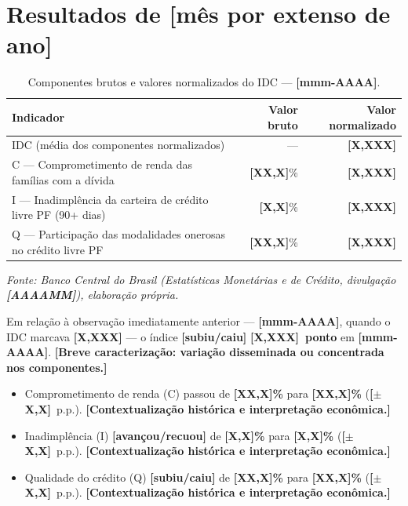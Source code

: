 \documentclass[11pt,a4paper]{article}
\newcommand{\fonte}[1]{%
  \par\vspace{0.2\baselineskip}%
  \small\textit{Fonte: #1}\par\vspace{0.8\baselineskip}%
}
\newcommand{\placeholder}[1]{\textcolor{red!70!black}{\textbf{[#1]}}}
\newcommand{\mesreferencia}{\placeholder{mês por extenso de ano}}   %
\newcommand{\mesref}{\placeholder{mmm-AAAA}}                        %
\newcommand{\mesanterior}{\placeholder{mmm-AAAA}}                   %
\newcommand{\competencia}{\placeholder{AAAAMM}}                     %
\begin{document}
\section{Resultados de \mesreferencia}

\begin{table}[htbp]
  \centering
  \caption{Componentes brutos e valores normalizados do IDC --- \mesref.}
  \label{tab:componentes}
  \begin{tabular}{p{8.0cm}rr}
    \toprule
    Indicador & Valor bruto & Valor normalizado \\
    \midrule
    IDC (média dos componentes normalizados)
      & ---
      & \textbf{\placeholder{X,XXX}} \\
    C --- Comprometimento de renda das famílias com a dívida
      & \placeholder{XX,X}\%
      & \placeholder{X,XXX} \\
    I --- Inadimplência da carteira de crédito livre PF (90+ dias)
      & \placeholder{X,X}\%
      & \placeholder{X,XXX} \\
    Q --- Participação das modalidades onerosas no crédito livre PF
      & \placeholder{XX,X}\%
      & \placeholder{X,XXX} \\
    \bottomrule
  \end{tabular}
\end{table}

\fonte{Banco Central do Brasil (Estatísticas Monetárias e de Crédito,
divulgação \competencia), elaboração própria.}

Em relação à observação imediatamente anterior --- \textbf{\mesanterior}, quando o IDC
marcava \textbf{\placeholder{X,XXX}} --- o índice \placeholder{subiu\slash{}caiu}
\textbf{\placeholder{X,XXX}~ponto} em \mesref.
\placeholder{Breve caracterização: variação disseminada ou concentrada nos componentes.}

\begin{itemize}
  \item Comprometimento de renda (C) passou de \textbf{\placeholder{XX,X}\%} para
    \textbf{\placeholder{XX,X}\%} (\placeholder{$\pm$X,X}~p.p.).
    \placeholder{Contextualização histórica e interpretação econômica.}

  \item Inadimplência (I) \placeholder{avançou\slash{}recuou} de
    \textbf{\placeholder{X,X}\%} para \textbf{\placeholder{X,X}\%}
    (\placeholder{$\pm$X,X}~p.p.).
    \placeholder{Contextualização histórica e interpretação econômica.}

  \item Qualidade do crédito (Q) \placeholder{subiu\slash{}caiu} de
    \textbf{\placeholder{XX,X}\%} para \textbf{\placeholder{XX,X}\%}
    (\placeholder{$\pm$X,X}~p.p.).
    \placeholder{Contextualização histórica e interpretação econômica.}
\end{itemize}
\end{document}
